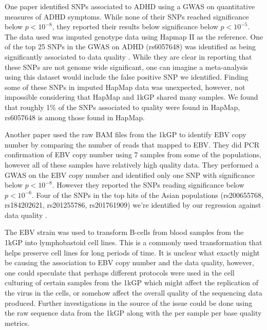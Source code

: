 \documentclass[9pt,lineno]{elife}
\begin{document}
One paper identified SNPs associated to ADHD using a GWAS on quantitative measures of ADHD symptoms.
While none of their SNPs reached significance below $ p < 10^{-8}$, they reported their results below significance below $ p < 10^{-5}$.
The data used was imputed genotype data using Hapmap II as the reference.
One of the top 25 SNPs in the GWAS on ADHD (rs6057648) was identified as being significantly associated to data quality \citep{Ebejer2013}.
While they are clear in reporting that these SNPs are not genome wide significant, one can imagine a meta-analysis using this dataset would include the false positive SNP we identified.
Finding some of these SNPs in imputed HapMap data was unexpected, however, not impossible considering that HapMap and 1kGP shared many samples.
We found that roughly 1\% of the SNPs associated to quality were found in HapMap,  rs6057648 is among those found in HapMap.

Another paper used the raw BAM files from the 1kGP to identify EBV copy number by comparing the number of reads that mapped to EBV.
They did PCR confirmation of EBV copy number using 7 samples from some of the populations, however all of these samples have relatively high quality data.
They performed a GWAS on the EBV copy number and identified only one SNP with significance below $ p < 10^{-8}$. 
However they reported the SNPs reading significance below $ p < 10^{-6}$. 
Four of the SNPs in the top hits of the Asian populations (rs200655768, rs184202621, rs201255786, rs201761909) we're identified by our regression against data quality \citep{Mandage2017}.

The EBV strain was used to transform B-cells from blood samples from the 1kGP into lymphobastoid cell lines.
This is a commonly used transformation that helps preserve cell lines for long periods of time.
It is unclear what exactly might be causing the association to EBV copy number and the data quality, however, one could speculate that perhaps different protocols were used in the cell culturing of certain samples from the 1kGP which might affect the replication of the virus in the cells, or somehow affect the overall quality of the sequencing data produced.
Further investigations in the source of the issue could be done using the raw sequence data from the 1kGP along with the per sample per base quality metrics. 			
\end{document}
